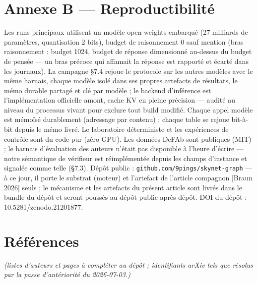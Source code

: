 \documentclass[11pt]{article}
\begin{document}
\section*{Annexe B — Reproductibilité}

Les runs principaux utilisent un modèle open-weights embarqué (27 milliards de paramètres, quantisation 2 bits), budget de raisonnement 0 sauf mention (bras raisonnement : budget 1024, budget de réponse dimensionné au-dessus du budget de pensée — un bras précoce qui affamait la réponse est rapporté et écarté dans les journaux). La campagne §7.4 rejoue le protocole sur les autres modèles avec le même harnais, chaque modèle isolé dans ses propres artefacts de résultats, le mémo durable partagé et clé par modèle ; le backend d'inférence est l'implémentation officielle amont, cache KV en pleine précision — audité au niveau du processus vivant pour exclure tout build modifié. Chaque appel modèle est mémoïsé durablement (adressage par contenu) ; chaque table se rejoue bit-à-bit depuis le mémo livré. Le laboratoire déterministe et les expériences de contrôle sont du code pur (zéro GPU). Les données DeFAb sont publiques (MIT) ; le harnais d'évaluation des auteurs n'était pas disponible à l'heure d'écrire — notre sémantique de vérifieur est réimplémentée depuis les champs d'instance et signalée comme telle (§7.3). Dépôt public : \texttt{github.com/\allowbreak{}9pings/\allowbreak{}skynet-graph} — à ce jour, il porte le substrat (moteur) et l'artefact de l'article compagnon [Braun 2026] seuls ; le mécanisme et les artefacts du présent article sont livrés dans le bundle du dépôt et seront poussés au dépôt public après dépôt. DOI du dépôt : 10.5281/zenodo.21201877.

\section*{Références}

\emph{(listes d'auteurs et pages à compléter au dépôt ; identifiants arXiv tels que résolus par la passe d'antériorité du 2026-07-03.)}
\end{document}
